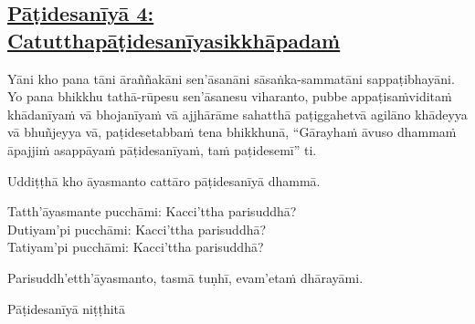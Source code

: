 \subsection*{\hyperref[ack4]{Pāṭidesanīyā 4: Catutthapāṭidesanīyasikkhāpadaṁ}}
\label{pd4}

Yāni kho pana tāni āraññakāni sen'āsanāni sāsaṅka-sammatāni sappaṭibhayāni. Yo pana bhikkhu tathā-rūpesu sen'āsanesu viharanto, pubbe appaṭisaṁviditaṁ khādanīyaṁ vā bhojanīyaṁ vā ajjhārāme sahatthā paṭiggahetvā agilāno khādeyya vā bhuñjeyya vā, paṭidesetabbaṁ tena bhikkhunā, “Gārayhaṁ āvuso dhammaṁ āpajjiṁ asappāyaṁ pāṭidesanīyaṁ, taṁ paṭidesemī” ti.

\medskip

\begin{center}
Uddiṭṭhā kho āyasmanto cattāro pāṭidesanīyā dhammā.

\smallskip

Tatth'āyasmante pucchāmi: Kacci'ttha parisuddhā?\\
Dutiyam'pi pucchāmi: Kacci'ttha parisuddhā?\\
Tatiyam'pi pucchāmi: Kacci'ttha parisuddhā?

\smallskip

Parisuddh'etth'āyasmanto, tasmā tuṇhī, evam'etaṁ dhārayāmi.
\end{center}

\begin{outro}
  Pāṭidesanīyā niṭṭhitā
\end{outro}

\clearpage
